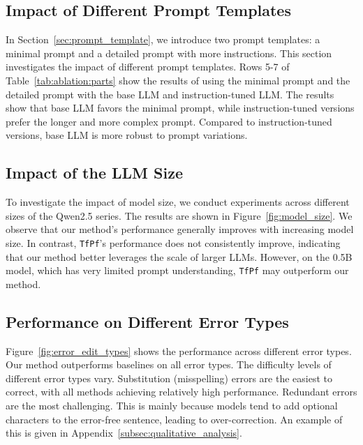 \subsection{Impact of Different Prompt Templates}
\label{sec:analysis:prompt_template}
In Section~\ref{sec:prompt_template}, we introduce two prompt templates:
a minimal prompt and a detailed prompt with more instructions.
This section investigates the impact of different prompt templates.
Rows 5-7 of Table~\ref{tab:ablation:parts} show the results of using the minimal prompt and the detailed prompt with the base LLM and instruction-tuned LLM.
The results show that base LLM favors the minimal prompt, while instruction-tuned versions prefer the longer and more complex prompt.
Compared to instruction-tuned versions, base LLM is more robust to prompt variations.

\subsection{Impact of the LLM Size}
\label{sec:ablation:size}
To investigate the impact of model size, we conduct experiments across different sizes of the Qwen2.5 series.
The results are shown in Figure~\ref{fig:model_size}.
We observe that our method's performance generally improves with increasing model size.
In contrast, \texttt{TfPf}'s performance does not consistently improve,
indicating that our method better leverages the scale of larger LLMs.
However, on the 0.5B model, which has very limited prompt understanding, \texttt{TfPf} may outperform our method.

\subsection{Performance on Different Error Types}
\label{sec:analysis:error_type}

Figure~\ref{fig:error_edit_types} shows the performance across different error types.
Our method outperforms baselines on all error types.
The difficulty levels of different error types vary.
Substitution (misspelling) errors are the easiest to correct, with all methods achieving relatively high performance.
Redundant errors are the most challenging.
This is mainly because models tend to add optional characters to the error-free sentence, leading to over-correction.
An example of this is given in Appendix~\ref{subsec:qualitative_analysis}.


